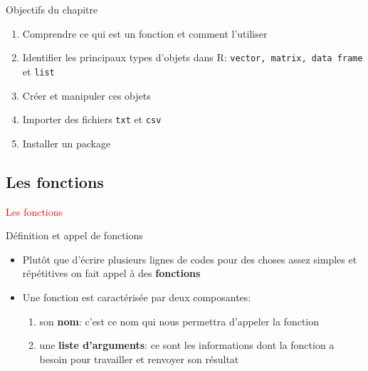 \documentclass[11pt]{beamer}\usepackage[]{graphicx}\usepackage[]{color}
\newcommand{\code}[1]{\texttt{#1}}
\begin{document}
\begin{frame}[plain]
\hspace*{-1.0cm}\parbox[t]{\textwidth}{
\begin{block}{Objectifs du chapitre}
\begin{enumerate}
\item Comprendre ce qui est un fonction et comment l'utiliser
\item Identifier les principaux types d'objets dans R: \code{vector, matrix, data frame} et \code{list} 
\item Cr\'{e}er et manipuler ces objets
\item Importer des fichiers \code{txt} et \code{csv}
\item Installer un package
\end{enumerate}
\end{block}
}
\end{frame}





\subsection{Les fonctions}

\begin{frame}
 \begin{center}
  \Huge{\textcolor{red}{Les fonctions}}
 \end{center}
\end{frame}



\begin{frame}{Définition et appel de fonctions}
\begin{itemize}
 \setlength\itemsep{2em}
\item Plutôt que d'écrire plusieurs lignes de codes pour des choses assez simples et répétitives on fait appel à des \textbf{fonctions}
\pause \item Une fonction est caractérisée par deux composantes:
\pause 
\begin{enumerate}
\normalsize
\item son \textbf{nom}: c'est ce nom qui nous permettra d'appeler la fonction
\pause \item une \textbf{liste d'arguments}: ce sont les informations dont la fonction a besoin pour travailler et renvoyer son résultat
\end{enumerate}
\end{itemize}
\end{frame}
\end{document}
